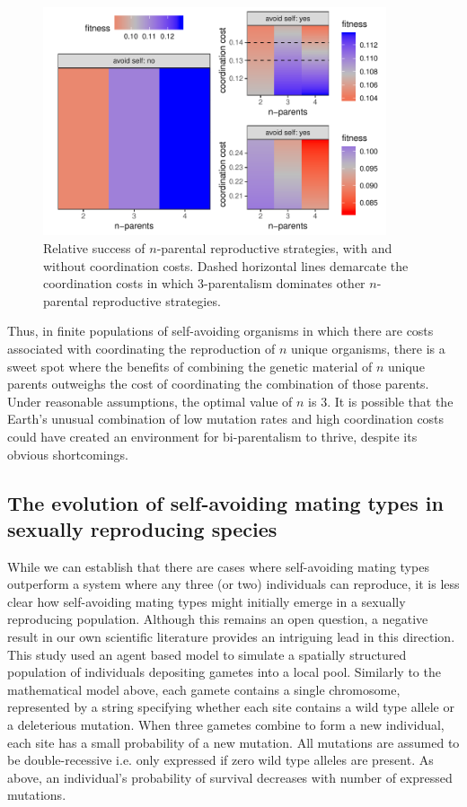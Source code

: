 \documentclass{report}
\begin{document}
\begin{figure}
    \centering
    \includegraphics[width=0.9\textwidth]{TylerFigures/tyler72plot.pdf}
    \caption{Relative success of $n$-parental reproductive strategies, with and without coordination costs. Dashed horizontal lines demarcate the coordination costs in which 3-parentalism dominates other $n$-parental reproductive strategies.}
    \label{fig:tylerModel}
\end{figure}

Thus, in finite populations of self-avoiding organisms in which there are costs associated with coordinating the reproduction of $n$ unique organisms, there is a sweet spot where the benefits of combining the genetic material of $n$ unique parents outweighs the cost of coordinating the combination of those parents. Under reasonable assumptions, the optimal value of $n$ is 3. It is possible that the Earth's unusual combination of low mutation rates and high coordination costs could have created an environment for bi-parentalism to thrive, despite its obvious shortcomings.

\subsection*{The evolution of self-avoiding mating types in sexually reproducing species}


While we can establish that there are cases where self-avoiding mating types outperform a system where any three (or two) individuals can reproduce, it is less clear how self-avoiding mating types might initially emerge in a sexually reproducing population. Although this remains an open question, a negative result in our own scientific literature provides an intriguing lead in this direction. This study used an agent based model to simulate a spatially structured population of individuals depositing gametes into a local pool. Similarly to the mathematical model above, each gamete contains a single chromosome, represented by a string specifying whether each site contains a wild type allele or a deleterious mutation. When three gametes combine to form a new individual, each site has a small probability of a new mutation. All mutations are assumed to be double-recessive i.e. only expressed if zero wild type alleles are present. As above, an individual’s probability of survival decreases with number of expressed mutations. 
\end{document}
